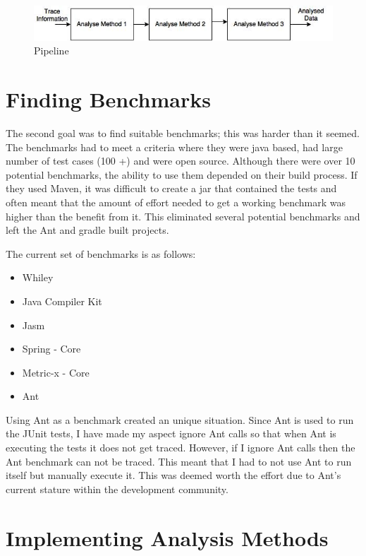 \begin{figure}[h]
\caption{Pipeline}
\label{fig:pipeline}
\includegraphics[width=\textwidth]{Pipeline.jpg}
\end{figure}


\section{Finding Benchmarks}

The second goal was to find suitable benchmarks; this was harder than it seemed. The benchmarks had to meet a criteria where they were java based, had large number of test cases (100 +) and were open source. Although there were over 10 potential benchmarks, the ability to use them depended on their build process. If they used Maven, it was difficult to create a jar that contained the tests and often meant that the amount of effort needed to get a working benchmark was higher than the benefit from it. This eliminated several potential benchmarks and left the Ant and gradle built projects. 

The current set of benchmarks is as follows:

\begin{itemize}
\item Whiley
\item Java Compiler Kit
\item Jasm
\item Spring - Core
\item Metric-x - Core
\item Ant
\end{itemize}


Using Ant as a benchmark created an unique situation. Since Ant is used to run the JUnit tests, I have made my aspect ignore Ant calls so that when Ant is executing the tests it does not get traced. However, if I ignore Ant calls then the Ant benchmark can not be traced. This meant that I had to not use Ant to run itself but manually execute it. This was deemed worth the effort due to Ant’s current stature within the development community. 

\section{Implementing Analysis Methods}

